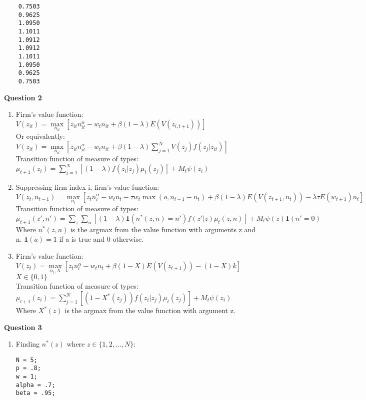 \documentclass[12pt]{article}
\begin{document}
\begin{onehalfspace}
\begin{enumerate}[1.]
\begin{lstlisting}
    0.7503
    0.9625
    1.0950
    1.1011
    1.0912
    1.0912
    1.1011
    1.0950
    0.9625
    0.7503
	\end{lstlisting}
	\end{enumerate}

\textbf{Question 2}
\begin{enumerate}[1.]
    \item 
    Firm's value function:\\
    $V(z_{it}) = \max\limits_{n_{it}}\left[z_{it}n_{it}^\alpha -w_tn_{it} + \beta(1-\lambda) E(V(z_{i,t+1}))\right]$\\
    Or equivalently:\\
    $V(z_{it}) = \max\limits_{n_{it}}\left[z_{it}n_{it}^\alpha -w_tn_{it} + \beta(1-\lambda) \sum\limits_{j=1}^{N}V(z_j)f(z_j|z_{it})\right]$\\
    Transition function of measure of types:\\
    $\mu_{t+1}(z_i) = \sum\limits_{j=1}^{N}\left[(1-\lambda)f(z_i|z_j)\mu_t(z_j)\right] + M_t\psi(z_i)$
    \item
    Suppressing firm index i, firm's value function:\\
    $V(z_t, n_{t-1}) = \max\limits_{n_t}\left[z_tn_t^\alpha -w_tn_t -\tau w_t \max(o, n_{t-1}-n_t) + \beta(1-\lambda) E(V(z_{t+1},n_t)) -\lambda \tau E(w_{t+1}) n_t\right]$\\
    Transition function of measure of types:\\
    $\mu_{t+1}(z', n') = \sum\limits_{z}\sum\limits_{n}\left[(1-\lambda)\textbf{1}(n^*(z, n) = n')f(z'|z)\mu_t(z,n)\right] + M_t\psi(z)\textbf{1}(n'=0)$\\
    Where $n^*(z,n)$ is the argmax from the value function with arguments z and n. $\textbf{1}(a) = 1$ if a is true and $0$ otherwise. 
    \item
    Firm's value function:\\
    $V(z_t) = \max\limits_{n_t, X}\left[z_t n_t^\alpha -w_t n_t + \beta(1-X) E(V(z_{t+1})) - (1-X)k\right]$\\
    $X \in \{0,1\}$\\
    Transition function of measure of types:\\
    $\mu_{t+1}(z_i) = \sum\limits_{j=1}^{N}\left[(1-X^*(z_j))f(z_i|z_j)\mu_t(z_j)\right] + M_t\psi(z_i)$\\
    Where $X^*(z)$ is the argmax from the value function with argument z.
\end{enumerate}

\textbf{Question 3}
\begin{enumerate}[1.]
    \item 
    Finding $n^*(z)$ where $z \in \{1,2,...,N\}$:
    \begin{lstlisting}
N = 5;
p = .8;
w = 1;
alpha = .7;
beta = .95;


\end{lstlisting}
\end{enumerate}
\end{onehalfspace}
\end{document}
